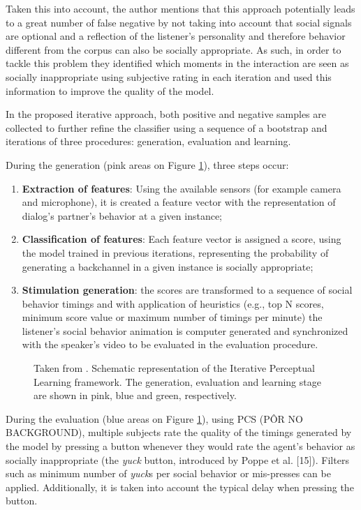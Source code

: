 Taken this into account, the author mentions that this approach potentially leads to a great number of false negative by not taking into account that social signals are optional and a reflection of the listener's personality and therefore behavior different from the corpus can also be socially appropriate. As such, in order to tackle this problem they identified which moments in the interaction are seen as socially inappropriate using subjective rating in each iteration and used this information to improve the quality of the model.

In the proposed iterative approach, both positive and negative samples are collected to further refine the classifier using a sequence of a bootstrap and iterations of three procedures: generation, evaluation and learning.

During the generation (pink areas on Figure \ref{fig:ipl_system}), three steps occur:
\begin{enumerate}
	\item \textbf{Extraction of features}: Using the available sensors (for example camera and microphone), it is created a feature vector with the representation of dialog's partner's behavior at a given instance;
	\item \textbf{Classification of features}: Each feature vector is assigned a score, using the model trained in previous iterations, representing the probability of generating a backchannel in a given instance is socially appropriate;
	\item \textbf{Stimulation generation}: the scores are transformed to a sequence of social behavior timings and with application of heuristics (e.g., top N scores, minimum score value or maximum number of timings per minute) the listener's social behavior animation is computer generated and synchronized with the speaker's video to be evaluated in the evaluation procedure.
\end{enumerate}

\begin{figure}[htbp]
	\centering
	\caption{Taken from \cite{Kok2012}. Schematic representation of the Iterative Perceptual Learning framework. The generation, evaluation and learning stage are shown in pink, blue and green, respectively.}
	\label{fig:ipl_system}
\end{figure}

During the evaluation (blue areas on Figure \ref{fig:ipl_system}), using \ac{PCS} (PÔR NO BACKGROUND), multiple subjects rate the quality of the timings generated by the model by pressing a button whenever they would rate the agent's behavior as socially inappropriate (the \textit{yuck} button, introduced by Poppe et al. [15]). Filters such as minimum number of \textit{yuck}s per social behavior or mis-presses can be applied. Additionally, it is taken into account the typical delay when pressing the button.

